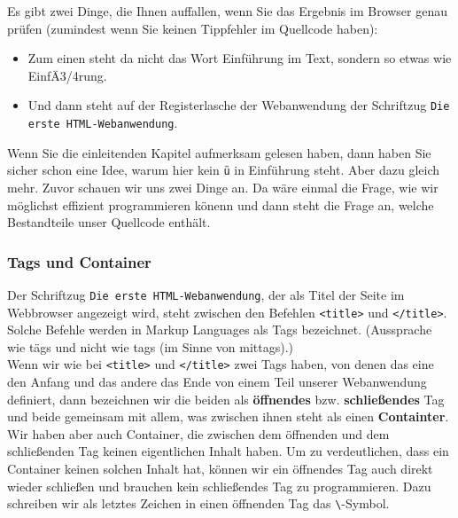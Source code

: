 Es gibt zwei Dinge, die Ihnen auffallen, wenn Sie das Ergebnis im Browser genau prüfen (zumindest wenn Sie keinen Tippfehler im Quellcode haben): \\

\begin{itemize}
	\item Zum einen steht da nicht das Wort Einführung im Text, sondern so etwas wie EinfÄ3/4rung.
	\item Und dann steht auf der Registerlasche der Webanwendung der Schriftzug \verb|Die erste HTML-Webanwendung|.
\end{itemize}

Wenn Sie die einleitenden Kapitel aufmerksam gelesen haben, dann haben Sie sicher schon eine Idee, warum hier kein \verb|ü| in Einführung steht. Aber dazu gleich mehr. Zuvor schauen wir uns zwei Dinge an. Da wäre einmal die Frage, wie wir möglichst effizient programmieren könenn und dann steht die Frage an, welche Bestandteile unser Quellcode enthält.

\subsubsection{Tags und Container}

Der Schriftzug \verb|Die erste HTML-Webanwendung|, der als Titel der Seite im Webbrowser angezeigt wird, steht zwischen den \glqq{}Befehlen\grqq{} \verb|<title>| und \verb|</title>|. Solche \glqq{}Befehle\grqq{} werden in Markup Languages als Tags bezeichnet. (Aussprache wie tägs und nicht wie tags (im Sinne von mittags).)\\

Wenn wir wie bei \verb|<title>| und \verb|</title>| zwei Tags haben, von denen das eine den Anfang und das andere das Ende von einem Teil unserer Webanwendung definiert, dann bezeichnen wir die beiden als \textbf{öffnendes} bzw. \textbf{schließendes} Tag und beide gemeinsam mit allem, was zwischen ihnen steht als einen \textbf{Containter}.\\

Wir haben aber auch Container, die zwischen dem öffnenden und dem schließenden Tag keinen eigentlichen Inhalt haben. Um zu verdeutlichen, dass ein Container keinen solchen Inhalt hat, können wir ein öffnendes Tag auch direkt wieder schließen und brauchen kein schließendes Tag zu programmieren. Dazu schreiben wir als letztes Zeichen in einen öffnenden Tag das \verb|\|-Symbol.\\


